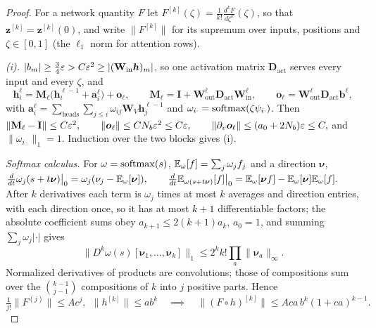 \begin{proof}
For a network quantity $F$ let $F^{[k]}(\zeta)=\frac{1}{k!}\frac{d^kF}{d\zeta^k}(\zeta)$, so that $\bm z^{[k]}=\bm z^{[k]}(0)$, and write $\|F^{[k]}\|$ for its supremum over
inputs, positions and $\zeta\in[0,1]$ (the $\ell_1$ norm for attention rows).

\emph{(i).} $|b_m|\ge\frac{3}{4}\varepsilon>C\varepsilon^2\ge|(\mathbf W_{\mathrm{in}}\bm h)_m|$, so one activation matrix $\mathbf D_{\mathrm{act}}$ serves every input and every $\zeta$, and
\[
 \bm h_i^\ell=\mathbf M_\ell\bigl(\bm h_i^{\ell-1}+\bm a_i^\ell\bigr)+\bm o_\ell,\qquad \mathbf M_\ell=\mathbf I+\mathbf W^\ell_{\mathrm{out}}\mathbf D_{\mathrm{act}}\mathbf W^\ell_{\mathrm{in}},\qquad \bm o_\ell=\mathbf W^\ell_{\mathrm{out}}\mathbf D_{\mathrm{act}}\bm b^\ell,
\]
with $\bm a_i^\ell=\sum_{\mathrm{heads}}\sum_{j\le i}\omega_{ij}\mathbf W_V\bm h^{\ell-1}_j$ and $\omega_{i\cdot}=\operatorname{softmax}(\zeta\psi_{i\cdot})$. Then
 $\|\mathbf M_\ell-\mathbf I\|\le C\varepsilon^2,\qquad \|\bm o_\ell\|\le CN_b\varepsilon^2\le C\varepsilon,\qquad \|\partial_v\bm o_\ell\|\le(a_0+2N_b)\varepsilon\le C,$ 
and $\|\omega_{i\cdot}\|_1=1$. Induction over the two blocks gives (i).

\emph{Softmax calculus.} For $\omega=\operatorname{softmax}(s)$, $\mathbb E_\omega[f]=\sum_j\omega_jf_j$ and a direction $\bm\nu$,
 $\tfrac{d}{dt}\omega_j(s+t\bm\nu)\big|_0=\omega_j(\nu_j-\E_\omega[\bm\nu]),\qquad \tfrac{d}{dt}\E_{\omega(s+t\bm\nu)}[f]\big|_0=\E_\omega[\bm\nu f]-\E_\omega[\bm\nu]\E_\omega[f].$ 
After $k$ derivatives each term is $\omega_j$ times at most $k$ averages and direction entries, with each direction once, so it has at
most $k+1$ differentiable factors; the absolute coefficient sums obey $a_{k+1}\le2(k+1)a_k$, $a_0=1$, and summing $\sum_j\omega_j|\cdot|$ gives
\begin{equation}
 \bigl\|D^k\omega(s)[\bm\nu_1,\ldots,\bm\nu_k]\bigr\|_1\le2^kk!\prod_a\|\bm\nu_a\|_\infty .
 \label{eq:softmax-avg}
\end{equation}
Normalized derivatives of products are convolutions; those of compositions sum over the $\binom{k-1}{j-1}$ compositions of $k$ into $j$
positive parts. Hence
 $\tfrac{1}{j!}\|F^{(j)}\|\le Ac^j,\ \ \|h^{[k]}\|\le ab^k\quad\implies\quad\|(F\circ h)^{[k]}\|\le Aca\,b^k(1+ca)^{k-1}.$ 


\end{proof}
